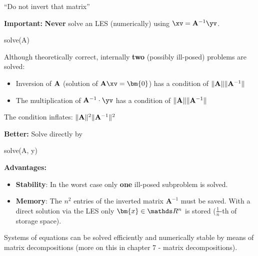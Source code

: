 \begin{vbframe}{\enquote{Do not invert that matrix}}

\textbf{Important:} \textbf{Never} solve an LES (numerically) using $\xv = \Amat^{-1} \yv$.
\lz
\footnotesize
\begin{verbbox}
solve(A) %
\end{verbbox}
\col
\lz

\normalsize
Although theoretically correct, internally \textbf{two} (possibly ill-posed) problems are solved:

\begin{itemize}
\item Inversion of $\mathbf{A}$ (solution of $\Amat \xv = \bm{0}$) has a condition of $\|\mathbf{A}\|\|\mathbf{A}^{-1}\|$
\item The multiplication of $\Amat^{-1} \cdot \yv$ has a condition of $\|\mathbf{A}\|\|\mathbf{A}^{-1}\|$
\end{itemize}

The condition inflates: $\|\mathbf{A}\|^2\|\mathbf{A}^{-1}\|^2$

\framebreak

\textbf{Better:} Solve directly by
\lz
\footnotesize
\begin{verbbox}
solve(A, y)
\end{verbbox}
\col
\lz
\normalsize
\textbf{Advantages:}

\begin{itemize}
\item \textbf{Stability}: In the worst case only \textbf{one} ill-posed subproblem is solved.
\item \textbf{Memory}: The $n^2$ entries of the inverted matrix $\bm{A}^{-1}$ must be saved. With a direct solution via the LES only $\bm{x}\in \R^n$ is stored ($\frac{1}{n}$-th of storage space).
\end{itemize}

Systems of equations can be solved efficiently and numerically stable by means of matrix decompositions (more on this in chapter 7 - matrix decompositions).

\end{vbframe}



